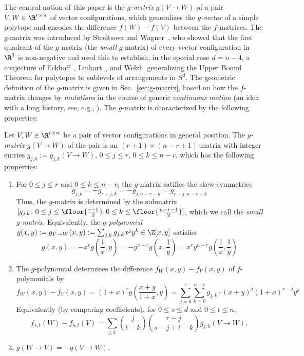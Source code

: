 %
The central notion of this paper is the \emph{$g$-matrix} $g(V\to W)$ of a pair $V,W \in \R^{r\times n}$ of vector configurations, which generalizes the \emph{$g$-vector} of a simple polytope and encodes the difference $f(W)-f(V)$ between the $f$-matrices. The $g$-matrix was introduced by Streltsova and Wagner~\cite{SW:Arcs}, who showed that the first quadrant of the $g$-matrix (the \emph{small} $g$-matrix) of every vector configuration in $\R^3$ is non-negative and used this to establish, in the special case $d=n-4$, a conjecture of Eckhoff~\cite{Eckhoff:1993aa}, Linhart~\cite{Linhart:1994aa}, and Welzl~\cite{Welzl:2001aa} generalizing the Upper Bound Theorem for polytopes to sublevels of arrangements in $S^d$.
%
The geometric definition of the $g$-matrix is given in Sec.~\ref{sec:g-matrix}, based on how the $f$-matrix changes by \emph{mutations} in the course of generic \emph{continuous motion} (an idea with a long history, see, e.g., \cite{Andrzejak:1998aa}). The $g$-matrix is characterized by the following properties:
\begin{theorem} 
\label{thm:f-g}
Let $V,W \in \R^{r\times n}$ be a pair of vector configurations in general position. 
%
The \emph{$g$-matrix} $g(V\to W)$ of the pair is an $(r+1)\times (n-r+1)$-matrix  with integer entries $g_{j,k}:=g_{j,k}(V\to W)$, $0\leq j\leq r$, $0\leq k \leq n-r$, which has the following properties:  
\begin{enumerate}
\item For $0\leq j\leq r$ and $0\leq k\leq n-r$, the $g$-matrix satifies the skew-symmetries
\begin{equation}
\label{eq:g-skew}
g_{j,k}=-g_{r-j,k}=-g_{j,n-r-k}=g_{r-j,n-r-k}
\end{equation}
Thus, the $g$-matrix is determined by the submatrix $[g_{j,k}\colon 0\leq j \leq \floor{\frac{r-1}{2}}, 0\leq k \leq \floor{\frac{n-r-1}{2}}]$, which we call the \emph{small $g$-matrix}. 
Equivalently, the \emph{$g$-polynomial} $g(x,y):=g_{V\to W}(x,y):=\sum_{j,k} g_{j,k} x^j y^k \in \Z[x,y]$ satisfies
\begin{equation}
\label{eq:g-poly-skew}
\textstyle g(x,y)=-x^rg(\frac{1}{x},y)=-y^{n-r}g(x,\frac{1}{y})=x^ry^{n-r}g(\frac{1}{x},\frac{1}{y})
\end{equation}
\item The $g$-polynomial determines the difference $f_W(x,y)-f_V(x,y)$ of $f$-polynomials by
\begin{equation}
\label{eq:f-poly-g-poly}
f_W(x,y)-f_V(x,y) = (1+x)^r g (\textstyle \frac{x+y}{1+x},y)=\sum_{j=0}^r \sum_{k=0}^{n-r} g_{j,k}\cdot (x+y)^j (1+x)^{r-j} y^k
\end{equation}
Equivalently (by comparing coefficients), for $0\leq s\leq d$ and $0\leq t\leq n$,
\begin{equation}
\label{eq:f-g-coefficients}
f_{s,t}(W)-f_{s,t}(V) = \sum_{j,k} \binom{j}{t-k}\binom{r-j}{s-j+t-k} g_{j,k}(V\to W),
\end{equation}
\item $g(W\to V)=-g(V\to W)$.
\end{enumerate}
\end{theorem}
